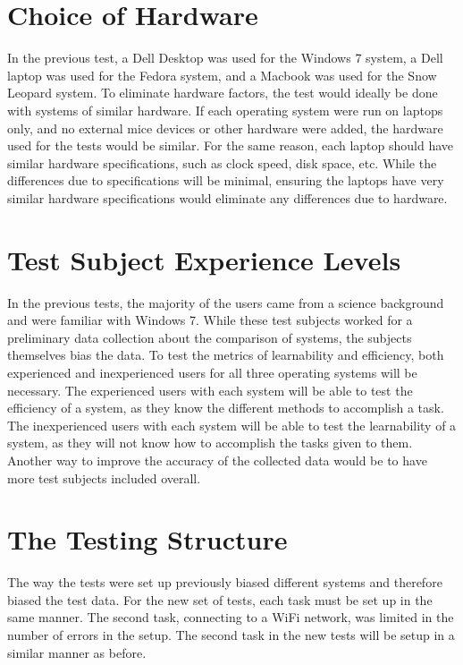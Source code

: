 \documentclass[11pt,letterpaper]{report}
\begin{document}
\section{Choice of Hardware}
In the previous test, a Dell Desktop was used for the Windows 7 system, a Dell laptop was used for the Fedora system, and a Macbook was used for the Snow Leopard system. To eliminate hardware factors, the test would ideally be done with systems of similar hardware. If each operating system were run on laptops only, and no external mice devices or other hardware were added, the hardware used for the tests would be similar. For the same reason, each laptop should have similar hardware specifications, such as clock speed, disk space, etc. While the differences due to specifications will be minimal, ensuring the laptops have very similar hardware specifications would eliminate any differences due to hardware. 

\section{Test Subject Experience Levels}
In the previous tests, the majority of the users came from a science background and were familiar with Windows 7. While these test subjects worked for a preliminary data collection about the comparison of systems, the subjects themselves bias the data. To test the metrics of learnability and efficiency, both experienced and inexperienced users for all three operating systems will be necessary. The experienced users with each system will be able to test the efficiency of a system, as they know the different methods to accomplish a task. The inexperienced users with each system will be able to test the learnability of a system, as they will not know how to accomplish the tasks given to them. Another way to improve the accuracy of the collected data would be to have more test subjects included overall. 

\section{The Testing Structure}
The way the tests were set up previously biased different systems and therefore biased the test data. For the new set of tests, each task must be set up in the same manner. The second task, connecting to a WiFi network, was limited in the number of errors in the setup. The second task in the new tests will be setup in a similar manner as before.
\end{document}
